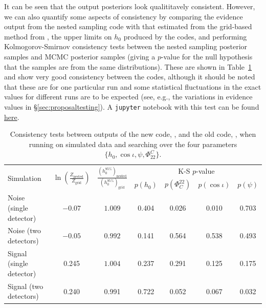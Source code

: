 It can be seen that the output posteriors look qualititavely consistent. However, we can also quantify some aspects of consistency by
comparing the evidence output from the nested sampling code with that estimated from the grid-based method from \lppe, the upper limits
on $h_0$ produced by the codes, and performing Kolmogorov-Smirnov consistency tests between the nested sampling posterior samples
and MCMC posterior samples (giving a $p$-value for the null hypothesis that the samples are from the same distributions).
These are shown in Table~\ref{tab:codeeval} and show very good consistency between the codes, although it should be noted that
these are for one particular run and some statistical fluctuations in the exact values for different runs are to be expected (see, e.g.,
the variations in evidence values in \S\ref{sec:proposaltesting}). A {\tt jupyter} notebook with this test can be found \href{https://github.com/mattpitkin/CW_nested_sampling_doc/blob/master/figures/codeeval/simulations/noise/SimulatedNoiseTestsPaper.ipynb}{here}.

\begin{table}[hptb]
\caption{Consistency tests between outputs of the new code, \lppen, and the old code, \lppe, when running on simulated data
and searching over the four parameters $\{h_0, \cos{\iota}, \psi, \Phi_{22}^C\}$.\label{tab:codeeval}}
\begin{center}
\begin{tabular}{l c c | c c c c}
\hline
\multirow{2}{*}{Simulation} & \multirow{2}{*}{$\ln{\left(\frac{Z_{\text{nested}}}{Z_{\text{grid}}}\right)}$} & \multirow{2}{*}{$\frac{(h_0^{95\%})_{\text{nested}}}{(h_0^{95\%})_{\text{grid}}}$} & 
\multicolumn{4}{c}{K-S $p$-value} \\ \cline{4-7}
 &  &  & $p(h_0)$ & $p(\Phi_C^{22})$ & $p(\cos{\iota})$ & $p(\psi)$ \\                      
\hline
\hline
Noise (single detector)  & $-0.07$ & $1.009$ & 0.404 & 0.026 & 0.010 & 0.703 \\
Noise (two detectors)    & $-0.05$ & $0.992$ & 0.141 & 0.564 & 0.538 & 0.493 \\
Signal (single detector) & 0.245   & $1.004$ & 0.237 & 0.291 & 0.125 & 0.175 \\
Signal (two detectors)   & 0.240   & 0.991   & 0.722 & 0.052 & 0.067 & 0.032 \\
\hline
\end{tabular}
\end{center}
\end{table}

